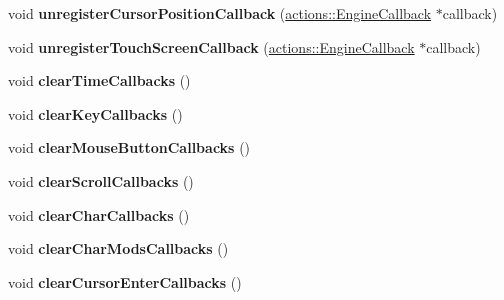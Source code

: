 \begin{DoxyCompactItemize}
\item 
\hypertarget{classfillwave_1_1Engine_a47a41a96d50cd7ba94507ffd2e1464bd}{}void {\bfseries unregister\+Cursor\+Position\+Callback} (\hyperlink{classfillwave_1_1actions_1_1EngineCallback}{actions\+::\+Engine\+Callback} $\ast$callback)\label{classfillwave_1_1Engine_a47a41a96d50cd7ba94507ffd2e1464bd}

\item 
\hypertarget{classfillwave_1_1Engine_a70b75b1b731c9a4985f346da4f8f490d}{}void {\bfseries unregister\+Touch\+Screen\+Callback} (\hyperlink{classfillwave_1_1actions_1_1EngineCallback}{actions\+::\+Engine\+Callback} $\ast$callback)\label{classfillwave_1_1Engine_a70b75b1b731c9a4985f346da4f8f490d}

\item 
\hypertarget{classfillwave_1_1Engine_ae8e2afbd8982598754e162024babb9c9}{}void {\bfseries clear\+Time\+Callbacks} ()\label{classfillwave_1_1Engine_ae8e2afbd8982598754e162024babb9c9}

\item 
\hypertarget{classfillwave_1_1Engine_a9f90630c4f013812480e2ab6b4c02349}{}void {\bfseries clear\+Key\+Callbacks} ()\label{classfillwave_1_1Engine_a9f90630c4f013812480e2ab6b4c02349}

\item 
\hypertarget{classfillwave_1_1Engine_a4f8c930d4f6f480d06cdf7b51c832c6c}{}void {\bfseries clear\+Mouse\+Button\+Callbacks} ()\label{classfillwave_1_1Engine_a4f8c930d4f6f480d06cdf7b51c832c6c}

\item 
\hypertarget{classfillwave_1_1Engine_a045648d991fcef2ed6f7fec829c37ec0}{}void {\bfseries clear\+Scroll\+Callbacks} ()\label{classfillwave_1_1Engine_a045648d991fcef2ed6f7fec829c37ec0}

\item 
\hypertarget{classfillwave_1_1Engine_a88dbcafd5555481da6267e05b1eb5e6b}{}void {\bfseries clear\+Char\+Callbacks} ()\label{classfillwave_1_1Engine_a88dbcafd5555481da6267e05b1eb5e6b}

\item 
\hypertarget{classfillwave_1_1Engine_a82fd5a72f17e81288f846e1af52294ed}{}void {\bfseries clear\+Char\+Mods\+Callbacks} ()\label{classfillwave_1_1Engine_a82fd5a72f17e81288f846e1af52294ed}

\item 
\hypertarget{classfillwave_1_1Engine_a29648a4414f7a025ebc4f01d37e029f2}{}void {\bfseries clear\+Cursor\+Enter\+Callbacks} ()\label{classfillwave_1_1Engine_a29648a4414f7a025ebc4f01d37e029f2}


\end{DoxyCompactItemize}
